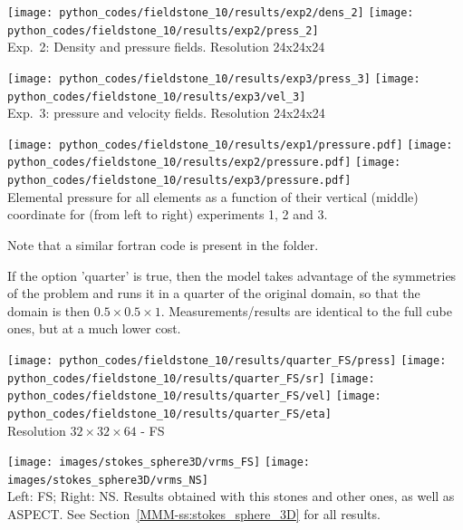 \begin{center}
\texttt{[image: python\_codes/fieldstone\_10/results/exp2/dens\_2]}
\texttt{[image: python\_codes/fieldstone\_10/results/exp2/press\_2]}\\
{\small Exp.~2: Density and pressure fields. Resolution 24x24x24}
\end{center}


\begin{center}
\texttt{[image: python\_codes/fieldstone\_10/results/exp3/press\_3]}
\texttt{[image: python\_codes/fieldstone\_10/results/exp3/vel\_3]}\\
{\small Exp.~3: pressure and velocity fields. Resolution 24x24x24}
\end{center}

\begin{center}
\texttt{[image: python\_codes/fieldstone\_10/results/exp1/pressure.pdf]}
\texttt{[image: python\_codes/fieldstone\_10/results/exp2/pressure.pdf]}
\texttt{[image: python\_codes/fieldstone\_10/results/exp3/pressure.pdf]}\\
{\captionfont Elemental pressure for all elements as a function of their vertical 
(middle) coordinate for (from left to right) experiments 1, 2 and 3. }
\end{center}

Note that a similar fortran code is present in the folder. 

If the option 'quarter' is true, then the model takes advantage of the symmetries 
of the problem and runs it in a quarter of the original domain, so that 
the domain is then $0.5\times 0.5 \times 1$. Measurements/results are identical 
to the full cube ones, but at a much lower cost.

\begin{center}
\texttt{[image: python\_codes/fieldstone\_10/results/quarter\_FS/press]}
\texttt{[image: python\_codes/fieldstone\_10/results/quarter\_FS/sr]}
\texttt{[image: python\_codes/fieldstone\_10/results/quarter\_FS/vel]}
\texttt{[image: python\_codes/fieldstone\_10/results/quarter\_FS/eta]}\\
{\captionfont Resolution $32\times 32\times 64$ - FS}
\end{center}


\begin{center}
\texttt{[image: images/stokes\_sphere3D/vrms\_FS]}
\texttt{[image: images/stokes\_sphere3D/vrms\_NS]}\\
{\captionfont Left: FS; Right: NS. Results obtained with this stones and other ones, as well as ASPECT.
See Section~\ref{MMM-ss:stokes_sphere_3D} for all results.}
\end{center}

